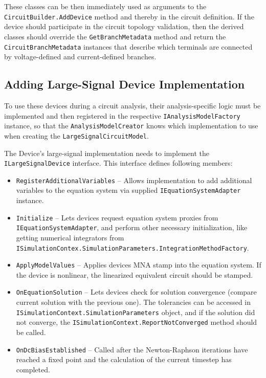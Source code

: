 These classes can be then immediately used as arguments to the \texttt{Circuit\+Builder.AddDevice} method and thereby in the circuit definition. If the device should participate in the circuit topology validation, then the derived classes should override the \texttt{GetBranchMetadata} method and return the \texttt{CircuitBranch\+Metadata} instances that describe which terminals are connected by voltage-defined and current-defined branches.

\subsection{Adding Large-Signal Device Implementation}

To use these devices during a circuit analysis, their analysis-specific logic must be implemented and then registered in the respective \texttt{IAnalysisModelFactory} instance, so that the \texttt{AnalysisModelCreator} knows which implementation to use when creating the \texttt{LargeSignalCircuitModel}.

The Device's large-signal implementation needs to implement the \texttt{ILarge\+SignalDevice} interface. This interface defines following members:

\begin{itemize}
	\item \texttt{RegisterAdditionalVariables} -- Allows implementation to add additional variables to the equation system via supplied \texttt{IEquationSystemAdapter} instance.
	\item \texttt{Initialize} -- Lets devices request equation system proxies from \texttt{IEquation\+SystemAdapter}, and perform other necessary initialization, like getting numerical integrators from \texttt{ISimulationContex.SimulationParameters.\+IntegrationMethodFactory}.
	\item \texttt{ApplyModelValues} -- Applies devices MNA stamp into the equation system. If the device is nonlinear, the linearized equivalent circuit should be stamped.
	\item \texttt{OnEquationSolution} -- Lets devices check for solution convergence (compare current solution with the previous one). The tolerancies can be accessed in \texttt{ISimulationContext.SimulationParameters} object, and if the solution did not converge, the \texttt{ISimulationContext.ReportNotConverged} method should be called.
	\item \texttt{OnDcBiasEstablished} -- Called after the Newton-Raphson iterations have reached a fixed point and the calculation of the current timestep has completed.
\end{itemize}

